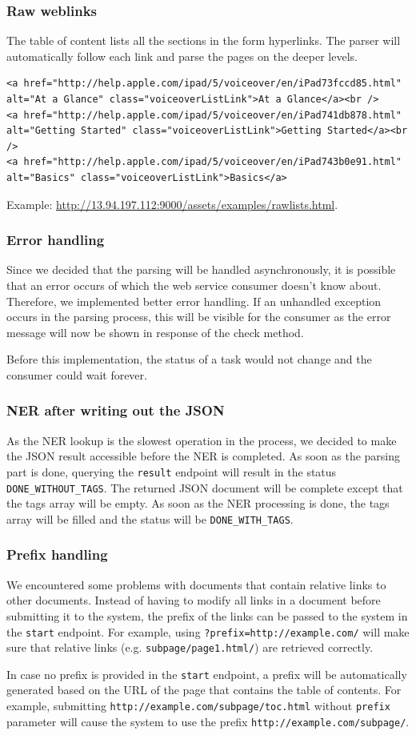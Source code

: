 \documentclass[a4paper,12pt]{article}
\begin{document}
\subsubsection*{Raw weblinks}
The table of content lists all the sections in the form hyperlinks. The parser will automatically follow each link and parse the pages on the deeper levels.
\begin{lstlisting}
<a href="http://help.apple.com/ipad/5/voiceover/en/iPad73fccd85.html" 
alt="At a Glance" class="voiceoverListLink">At a Glance</a><br />
<a href="http://help.apple.com/ipad/5/voiceover/en/iPad741db878.html" 
alt="Getting Started" class="voiceoverListLink">Getting Started</a><br />
<a href="http://help.apple.com/ipad/5/voiceover/en/iPad743b0e91.html" 
alt="Basics" class="voiceoverListLink">Basics</a>
\end{lstlisting}
Example: \url{http://13.94.197.112:9000/assets/examples/rawlists.html}.
\subsubsection*{Error handling}
Since we decided that the parsing will be handled asynchronously, it is possible that an error occurs of which the web service consumer doesn't know about. Therefore, we implemented better error handling. If an unhandled exception occurs in the parsing process, this will be visible for the consumer as the error message will now be shown in response of the check method.  \par
Before this implementation, the status of a task would not change and the consumer could wait forever.
\subsubsection*{NER after writing out the JSON}
As the NER lookup is the slowest operation in the process, we decided to make the JSON result accessible before the NER is completed. As soon as the parsing part is done, querying the \verb|result| endpoint will result in the status \verb|DONE_WITHOUT_TAGS|. The returned JSON document will be complete except that the tags array will be empty. As soon as the NER processing is done, the tags array will be filled and the status will be \verb|DONE_WITH_TAGS|.
\subsubsection*{Prefix handling}
We encountered some problems with documents that contain relative links to other documents. Instead of having to modify all links in a document before submitting it to the system, the prefix of the links can be passed to the system in the \verb|start| endpoint. For example, using \verb|?prefix=http://example.com/| will make sure that relative links (e.g. \verb|subpage/page1.html/|) are retrieved correctly.\par
In case no prefix is provided in the \verb|start| endpoint, a prefix will be automatically generated based on the URL of the page that contains the table of contents. For example, submitting \verb|http://example.com/subpage/toc.html| without \verb|prefix| parameter will cause the system to use the prefix \verb|http://example.com/subpage/|.
 
\end{document}
